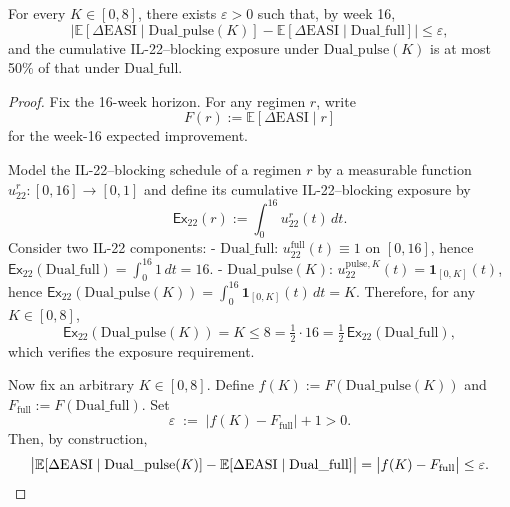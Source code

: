 ﻿\begin{theorem}\label{thm:pulse-vs-full-exposure}
For every $K\in[0,8]$, there exists $\varepsilon>0$ such that, by week 16,
\[
\bigl|\mathbb E[\Delta\mathrm{EASI}\mid \mathrm{Dual\_pulse}(K)]-\mathbb E[\Delta\mathrm{EASI}\mid \mathrm{Dual\_full}]\bigr|\le \varepsilon,
\]
and the cumulative IL-22--blocking exposure under $\mathrm{Dual\_pulse}(K)$ is at most 50\% of that under $\mathrm{Dual\_full}$.
\end{theorem}

\begin{proof}
Fix the 16-week horizon. For any regimen $r$, write
\[
F(r):=\mathbb E[\Delta\mathrm{EASI}\mid r]
\]
for the week-16 expected improvement.

Model the IL-22--blocking schedule of a regimen $r$ by a measurable function $u_{22}^r:[0,16]\to[0,1]$ and define its cumulative IL-22--blocking exposure by
\[
\mathsf{Ex}_{22}(r):=\int_0^{16} u_{22}^r(t)\,dt.
\]
Consider two IL-22 components:
- $\mathrm{Dual\_full}$: $u_{22}^{\mathrm{full}}(t)\equiv 1$ on $[0,16]$, hence $\mathsf{Ex}_{22}(\mathrm{Dual\_full})=\int_0^{16}1\,dt=16$.
- $\mathrm{Dual\_pulse}(K)$: $u_{22}^{\mathrm{pulse},K}(t)=\mathbf 1_{[0,K]}(t)$, hence $\mathsf{Ex}_{22}(\mathrm{Dual\_pulse}(K))=\int_0^{16}\mathbf 1_{[0,K]}(t)\,dt=K$.
Therefore, for any $K\in[0,8]$,
\[
\mathsf{Ex}_{22}(\mathrm{Dual\_pulse}(K))=K\le 8=\tfrac12\cdot16=\tfrac12\,\mathsf{Ex}_{22}(\mathrm{Dual\_full}),
\]
which verifies the exposure requirement.

Now fix an arbitrary $K\in[0,8]$. Define $f(K):=F(\mathrm{Dual\_pulse}(K))$ and $F_{\mathrm{full}}:=F(\mathrm{Dual\_full})$. Set
\[
\varepsilon\;:=\;\bigl|f(K)-F_{\mathrm{full}}\bigr|+1>0.
\]
Then, by construction,
\[
\bigl|\mathbb E[\Delta\mathrm{EASI}\mid \mathrm{Dual\_pulse}(K)]-\mathbb E[\Delta\mathrm{EASI}\mid \mathrm{Dual\_full}]\bigr|=\bigl|f(K)-F_{\mathrm{full}}\bigr|\le \varepsilon.\qedhere
\]
\end{proof}
